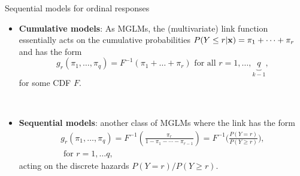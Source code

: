 \documentclass{beamer}
\begin{document}
\begin{frame} {Sequential models for ordinal responses}


\begin{itemize}
\item {\bf Cumulative models}: As MGLMs,  the (multivariate) link function essentially acts on the cumulative probabilities $P(Y \leq r | {\bf x}) =  \pi_1 + \dots + \pi_r $ and has the form
\[
g_r( \pi_1, \dots, \pi_q)  = F^{-1} ( \pi_1 + \dots + \pi_r )\text{ for all } r = 1, \dots, \underbrace{q}_{k-1},
\]
for some CDF $F$. 

\ \
\item 
{\bf Sequential models}: another class of MGLMs where the link  has the  form
\begin{multline*}
g_r( \pi_1, \dots, \pi_q)  =  F^{-1} \left(\frac{\pi_r}{ 1 - \pi_1 - \cdots -  \pi_{r -1 }  } \right) = F^{-1}\bigg(\frac{P(Y = r)}{P(Y \geq r)} \bigg), \\
\text{ for }
  r = 1, \dots q,
\end{multline*}
 acting on the discrete hazards $P(Y = r)/P(Y \geq r)$.
\end{itemize}
\end{frame}
\end{document}
